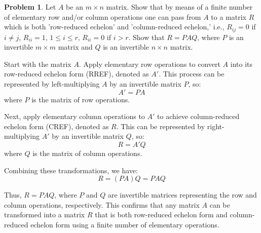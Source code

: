 \documentclass[12pt]{article}
\theoremstyle{definition}
\newtheorem{problem}{Problem}
\begin{document}
\begin{problem}        
    Let $A$ be an $m \times n$ matrix. Show that by means of a finite number of elementary row and/or column operations one can pass from $A$ to a matrix $R$ which is both
    'row-reduced echelon' and 'column-reduced echelon,' i.e., $R_{ij} = 0$ if $i \neq j$, $R_{ii} = 1$, $1 \leq i \leq r$, $R_{ii} = 0$ if $i > r$. Show that $R = PAQ$, where
    $P$ is an invertible $m \times m$ matrix and $Q$ is an invertible $n \times n$ matrix. 

    \begin{solution}
        Start with the matrix $A$. Apply elementary row operations to convert $A$ into its row-reduced echelon form (RREF), denoted as $A'$. This process can be represented by left-multiplying $A$ by an invertible matrix $P$, so:
        \[
        A' = PA
        \]
        where $P$ is the matrix of row operations.

        Next, apply elementary column operations to $A'$ to achieve column-reduced echelon form (CREF), denoted as $R$. This can be represented by right-multiplying $A'$ by an invertible matrix $Q$, so:
        \[
        R = A'Q
        \]
        where $Q$ is the matrix of column operations.

        Combining these transformations, we have:
        \[
        R = (PA)Q = PAQ
        \]

        Thus, $R = PAQ$, where $P$ and $Q$ are invertible matrices representing the row and column operations, respectively. This confirms that any matrix $A$ can be transformed into a matrix $R$ that is both row-reduced echelon form and column-reduced echelon form using a finite number of elementary operations.

    \end{solution}
\end{problem}
\end{document}
